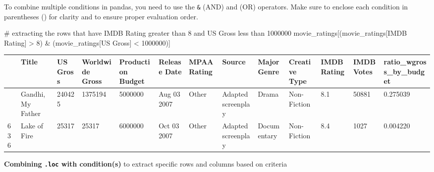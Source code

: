 \documentclass[
  letterpaper,
  DIV=11,
  numbers=noendperiod]{scrreprt}
\newenvironment{Shaded}{\begin{snugshade}}{\end{snugshade}}
\newcommand{\CommentTok}[1]{\textcolor[rgb]{0.37,0.37,0.37}{#1}}
\newcommand{\DecValTok}[1]{\textcolor[rgb]{0.68,0.00,0.00}{#1}}
\newcommand{\NormalTok}[1]{\textcolor[rgb]{0.00,0.23,0.31}{#1}}
\newcommand{\OperatorTok}[1]{\textcolor[rgb]{0.37,0.37,0.37}{#1}}
\newcommand{\StringTok}[1]{\textcolor[rgb]{0.13,0.47,0.30}{#1}}
\begin{document}
To combine multiple conditions in pandas, you need to use the
\texttt{\&} (AND) and \texttt{\textbar{}} (OR) operators. Make sure to
enclose each condition in parentheses () for clarity and to ensure
proper evaluation order.

\begin{Shaded}
\begin{Highlighting}[]
\CommentTok{\# extracting the rows that have IMDB Rating greater than 8 and US Gross less than 1000000}
\NormalTok{movie\_ratings[(movie\_ratings[}\StringTok{\textquotesingle{}IMDB Rating\textquotesingle{}}\NormalTok{] }\OperatorTok{\textgreater{}} \DecValTok{8}\NormalTok{) }\OperatorTok{\&}\NormalTok{ (movie\_ratings[}\StringTok{\textquotesingle{}US Gross\textquotesingle{}}\NormalTok{] }\OperatorTok{\textless{}} \DecValTok{1000000}\NormalTok{)]}
\end{Highlighting}
\end{Shaded}

\begin{longtable}[]{@{}lllllllllllll@{}}
\toprule\noalign{}
& Title & US Gross & Worldwide Gross & Production Budget & Release Date
& MPAA Rating & Source & Major Genre & Creative Type & IMDB Rating &
IMDB Votes & ratio\_wgross\_by\_budget \\
\midrule\noalign{}
\endhead
\bottomrule\noalign{}
\endlastfoot
21 & Gandhi, My Father & 240425 & 1375194 & 5000000 & Aug 03 2007 &
Other & Adapted screenplay & Drama & Non-Fiction & 8.1 & 50881 &
0.275039 \\
636 & Lake of Fire & 25317 & 25317 & 6000000 & Oct 03 2007 & Other &
Adapted screenplay & Documentary & Non-Fiction & 8.4 & 1027 &
0.004220 \\
\end{longtable}

\textbf{Combining \texttt{.loc} with condition(s)} to extract specific
rows and columns based on criteria
\end{document}
